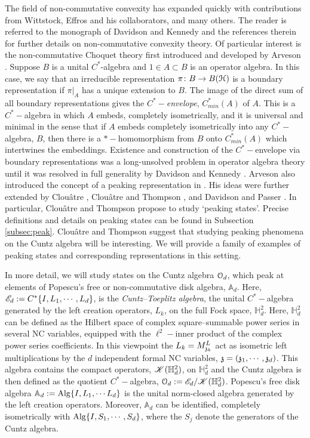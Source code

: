 \documentclass{article}
\theoremstyle{definition}
\theoremstyle{remark}
\numberwithin{equation}{section}
\newcommand{\mr}{\ensuremath{\mathrm}}
\newcommand{\scr}{\ensuremath{\mathscr}}
\newcommand{\mf}{\ensuremath{\mathfrak}}
\newcommand{\cuntz}{\ensuremath{\cO_d}}
\def\A{\mathbb{A} _d}
\def\hardy{\mathbb{H} ^2 _d}
\begin{document}
The field of non-commutative convexity has expanded quickly with contributions from Wittstock, Effros and his collaborators, and many others. The reader is referred to the monograph of Davidson and Kennedy \cite{DavidsonKennedy-big} and the references therein for further details on non-commutative convexity theory. Of particular interest is the non-commutative Choquet theory first introduced and developed by Arveson \cite{Arv-subalg, Arv-choq1, Arveson-choq2,Arveson-choq3}. Suppose $B$ is a unital $C^*$-algebra and $1 \in A \subset B$ is an operator algebra. In this case, we say that an irreducible representation $\pi \colon B \to B({\mathcal H})$ is a boundary representation if $\pi|_A$ has a unique extension to $B$. The image of the direct sum of all boundary representations gives the \emph{$C^*-$envelope}, $C^* _{min} (A)$ of $A$. This is a $C^*-$algebra in which $A$ embeds, completely isometrically, and it is universal and minimal in the sense that if $A$ embeds completely isometrically into any $C^*-$algebra, $B$, then there is a $*-$homomorphism from $B$ onto $C^* _{min} (A)$ which intertwines the embeddings. Existence and construction of the $C^*-$envelope via boundary representations was a long-unsolved problem in operator algebra theory until it was resolved in full generality by Davidson and Kennedy \cite{DavidsonKennedy,Arv-choq1,Arv-subalg,Hamana,DMc-boundary}. Arveson also introduced the concept of a peaking representation in \cite{Arveson-choq3}. His ideas were further extended by Clou\^{a}tre \cite{Clouatre-peaking}, Clou\^{a}tre and Thompson \cite{ClouThom-fin_dim,ClouThom-min_bound}, and Davidson and Passer \cite{DavidsonPasser}. In particular, Clou\^{a}tre and Thompson propose to study `peaking states'. Precise definitions and details on peaking states can be found in Subsection \ref{subsec:peak}. Clou\^{a}tre and Thompson \cite{ClouThom-min_bound} suggest that studying peaking phenomena on the Cuntz algebra will be interesting. We will provide a family of examples of peaking states and corresponding representations in this setting.

In more detail, we will study states on the Cuntz algebra $\cuntz$, which peak at elements of Popescu's free or non-commutative disk algebra, $\A$. Here, $\scr{E} _d := C^* \{ I , L_1 , \cdots , L_d \}$, is the \emph{Cuntz--Toeplitz algebra}, the unital $C^*-$algebra generated by the left creation operators, $L_k$, on the full Fock space, $\hardy$. Here, $\hardy$ can be defined as the Hilbert space of complex square--summable power series in several NC variables, equipped with the $\ell ^2-$inner product of the complex power series coefficients. In this viewpoint the $L_k = M ^L _{\mf{z} _k}$ act as isometric left multiplications by the $d$ independent formal NC variables, $\mf{z} = (\mf{z} _1 , \cdots , \mf{z} _d)$.  This algebra contains the compact operators, $\scr{K} (\hardy )$, on $\hardy$ and the Cuntz algebra is then defined as the quotient $C^*-$algebra,  $\cuntz := \scr{E} _d / \scr{K} ( \hardy )$. Popescu's free disk algebra $\A := \mr{Alg} \{ I , L_1, \cdots L_d \}$ is the unital norm-closed algebra generated by the left creation operators. Moreover, $\A$ can be identified, completely isometrically with $\mr{Alg} \{ I, S_1, \cdots , S_d \}$, where the $S_j$ denote the generators of the Cuntz algebra.
\end{document}
